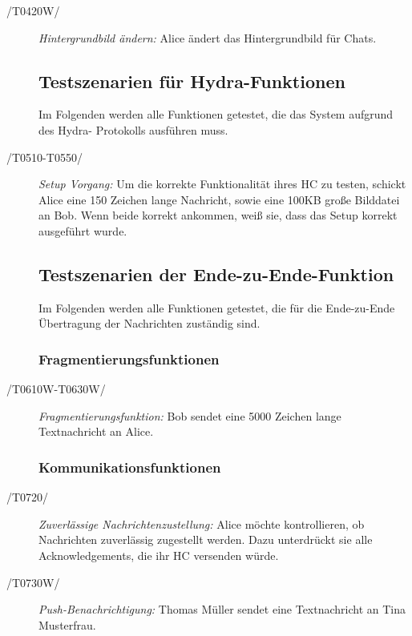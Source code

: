 \begin{description}
			
		\item[/T0420W/]
			\textit{Hintergrundbild ändern:}
			\textnormal{Alice ändert das Hintergrundbild für Chats.} 
			
			
			
	\subsection{Testszenarien für Hydra-Funktionen}	

Im Folgenden werden alle Funktionen getestet, die das System aufgrund des Hydra- Protokolls ausführen muss.
		
			\item[/T0510-T0550/]
				\textit{Setup Vorgang:}
				\textnormal{Um die korrekte Funktionalität ihres \ac{HC} zu testen, schickt Alice eine 150 Zeichen lange Nachricht, sowie eine 100KB große Bilddatei an Bob. Wenn beide korrekt ankommen, weiß sie, dass das Setup korrekt ausgeführt wurde.}
				
				\subsection{Testszenarien der Ende-zu-Ende-Funktion}
				Im Folgenden werden alle Funktionen getestet, die für die Ende-zu-Ende Übertragung der
 Nachrichten zuständig sind.
 
		\subsubsection{Fragmentierungsfunktionen}
			\item[/T0610W-T0630W/]
				\textit{Fragmentierungsfunktion:}
				\textnormal{Bob sendet eine 5000 Zeichen lange Textnachricht an Alice.}
				
		\subsubsection{Kommunikationsfunktionen}	
		
		
		
			\item[/T0720/]
				\textit{Zuverlässige Nachrichtenzustellung:}
				\textnormal{Alice möchte kontrollieren, ob Nachrichten zuverlässig zugestellt werden. Dazu unterdrückt sie alle Acknowledgements, die ihr \ac{HC} versenden würde.}
				
			\item[/T0730W/]
				\textit{Push-Benachrichtigung:}
				\textnormal{Thomas Müller sendet eine Textnachricht an Tina Musterfrau.}
				
				
	




			
			
	\end{description}

